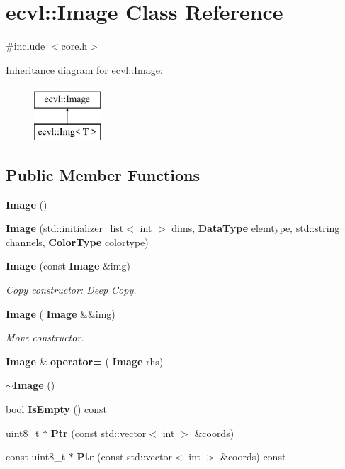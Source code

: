 \section{ecvl\+::Image Class Reference}
\label{classecvl_1_1_image}


{\ttfamily \#include $<$core.\+h$>$}

Inheritance diagram for ecvl\+::Image\+:\begin{figure}[H]
\begin{center}
\leavevmode
\includegraphics[height=2.000000cm]{classecvl_1_1_image}
\end{center}
\end{figure}
\subsection*{Public Member Functions}
\begin{DoxyCompactItemize}
\item 
\textbf{ Image} ()
\item 
\textbf{ Image} (std\+::initializer\+\_\+list$<$ int $>$ dims, \textbf{ Data\+Type} elemtype, std\+::string channels, \textbf{ Color\+Type} colortype)
\item 
\textbf{ Image} (const \textbf{ Image} \&img)
\begin{DoxyCompactList}\small\item\em Copy constructor\+: Deep Copy. \end{DoxyCompactList}\item 
\textbf{ Image} (\textbf{ Image} \&\&img)
\begin{DoxyCompactList}\small\item\em Move constructor. \end{DoxyCompactList}\item 
\textbf{ Image} \& \textbf{ operator=} (\textbf{ Image} rhs)
\item 
\textbf{ $\sim$\+Image} ()
\item 
bool \textbf{ Is\+Empty} () const
\item 
uint8\+\_\+t $\ast$ \textbf{ Ptr} (const std\+::vector$<$ int $>$ \&coords)
\item 
const uint8\+\_\+t $\ast$ \textbf{ Ptr} (const std\+::vector$<$ int $>$ \&coords) const
\end{DoxyCompactItemize}
